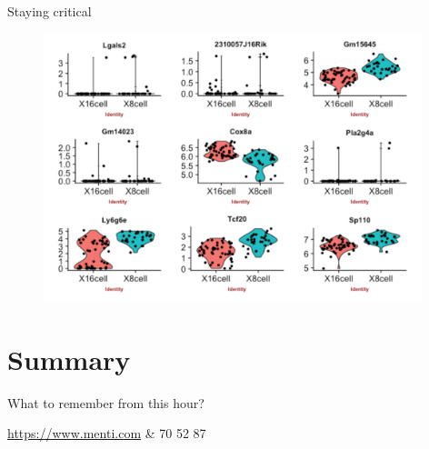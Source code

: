 \documentclass{beamer}\usepackage[]{graphicx}\usepackage[]{color}
\begin{document}
\begin{frame}
\begin{block}{Staying critical}
\begin{center}
\begin{figure}
\includegraphics[width=11cm]{Images/asa1.png}
\end{figure}
\end{center}
\end{block}
\end{frame}

\section{Summary}

\begin{frame}
\begin{center}
\colorbox{blue!10}{What to remember from this hour?}
\end{center}
\begin{center}
\href{https://www.menti.com}{https://www.menti.com} \& 70 52 87 %
\end{center}
\end{frame}
\end{document}
